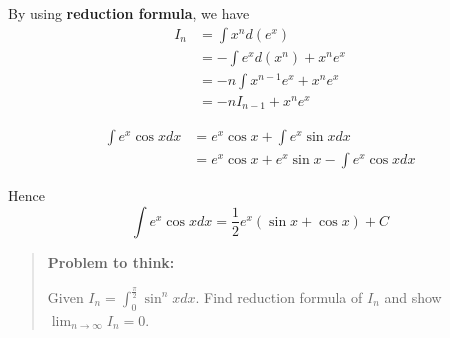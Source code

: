 By using \textbf{reduction formula}, we have
\begin{equation*}
\begin{split}
    I_n &= \int x^n d(e^x)\\
        &= -\int e^x d(x^n) + x^n e^x\\
        &= -n \int x^{n-1} e^x + x^n e^x\\
        &= -nI_{n-1} + x^n e^x
\end{split}
\end{equation*}

\begin{equation*}
\begin{split}
    \int e^x \cos x dx
    &= e^x \cos x + \int e^x \sin x dx\\
    &= e^x \cos x + e^x \sin x - \int e^x \cos x dx
\end{split}
\end{equation*}

Hence $$ \int e^x \cos x dx = \frac{1}{2} e^x (\sin x + \cos x) + C $$

\begin{quote}
    \textbf{Problem to think:}
    
    Given $ I_n = \int_0^\frac{\pi}{2} \sin^n x dx $. Find reduction formula of $I_n$ and show $\lim_{n \to \infty} I_n = 0$.
\end{quote}